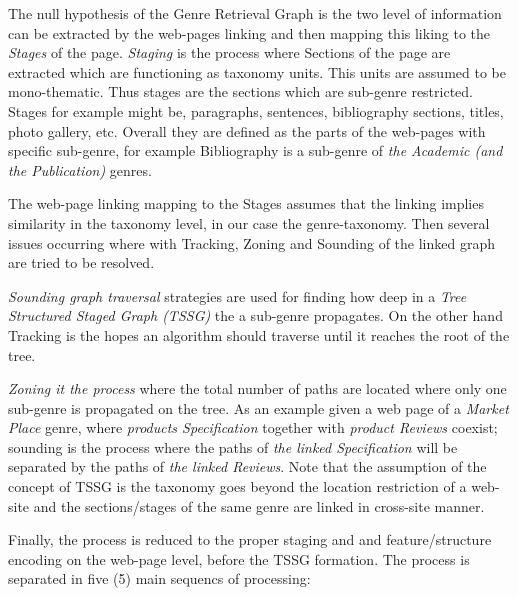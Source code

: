 The null hypothesis of the Genre Retrieval Graph is the two level of information can be extracted by the web-pages linking and then mapping this liking to the \textit{Stages} of the page. \textit{Staging} is the process where Sections of the page are extracted which are functioning as taxonomy units. This units are assumed to be mono-thematic. Thus stages are the sections which are sub-genre restricted. Stages for example might be, paragraphs, sentences, bibliography sections, titles, photo gallery, etc. Overall they are defined as the parts of the web-pages with specific sub-genre, for example Bibliography is a sub-genre of \textit{the Academic (and the Publication)} genres.

The web-page linking mapping to the Stages assumes that the linking implies similarity in the taxonomy level, in our case the genre-taxonomy. Then several issues occurring where with Tracking, Zoning and Sounding of the linked graph are tried to be resolved.

\textit{Sounding graph traversal} strategies are used for finding how deep in a \textit{Tree Structured Staged Graph (TSSG)}  the a sub-genre propagates. On the other hand Tracking is the hopes an algorithm should traverse until it reaches the root of the tree.

\textit{Zoning it the process} where the total number of paths are located where only one sub-genre is propagated on the tree. As an example given a web page of a \textit{Market Place} genre, where \textit{products Specification} together with \textit{product Reviews} coexist; sounding is the process where the paths of \textit{the linked Specification} will be separated by the paths of \textit{the linked Reviews}. Note that the assumption of the concept of TSSG is the taxonomy goes beyond the location restriction of a web-site and the sections/stages of the same genre are linked in cross-site manner.

Finally, the process is reduced to the proper staging and and feature/structure encoding on the web-page level, before the TSSG formation. The process is separated in five (5) main sequencs of processing:

